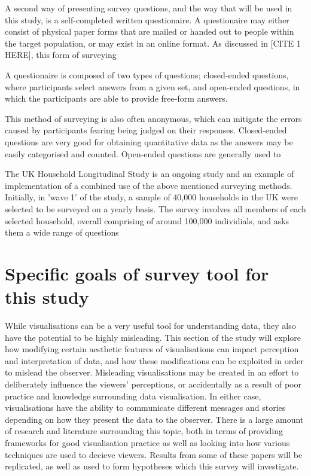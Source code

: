 A second way of presenting survey questions, and the way that will be used in this study, is a self-completed written questionaire.
A questionaire may either consist of physical paper forms that are mailed or handed out to people within the target population, or may
exist in an online format. As discussed in [CITE 1 HERE], this form of surveying 

A questionaire is composed of two types of questions; closed-ended questions, where participants 
select answers from a given set, and open-ended questions, in which the participants are able to provide free-form answers. 

This method of surveying
is also often anonymous, which can mitigate the errors caused by participants fearing being judged on their responses. Closed-ended questions are
very good for obtaining quantitative data as the answers may be easily categorised and counted. Open-ended questions are generally used to 

The UK Household Longitudinal Study is an ongoing study and an example of implementation of a combined use of the above mentioned surveying methods.
Initially, in 'wave 1' of the study, a sample of 40,000 households in the UK were selected to be surveyed on a yearly basis. The survey involves all 
members of each selected household, overall comprising of around 100,000 individials, and asks them a wide range of questions





\section{Specific goals of survey tool for this study}
While visualisations can be a very useful tool for understanding data, they also have the potential to be highly misleading. This section of the 
study will explore how modifying certain aesthetic features of visualisations can impact perception and interpretation of data, and how these 
modifications can be exploited in order to mislead the observer. Misleading visualisations may be created in an effort to deliberately influence the 
viewers' perceptions, or accidentally as a result of poor practice and knowledge surrounding data visualisation. In either case, visualisations have the
ability to communicate different messages and stories depending on how they present the data to the observer. There is a large amount of research and 
literature surrounding this topic, both in terms of providing frameworks for good visualisation practice as well as looking into how various techniques 
are used to decieve viewers. Results from some of these papers will be replicated, as well as used to form hypotheses which this survey will investigate.\newline

